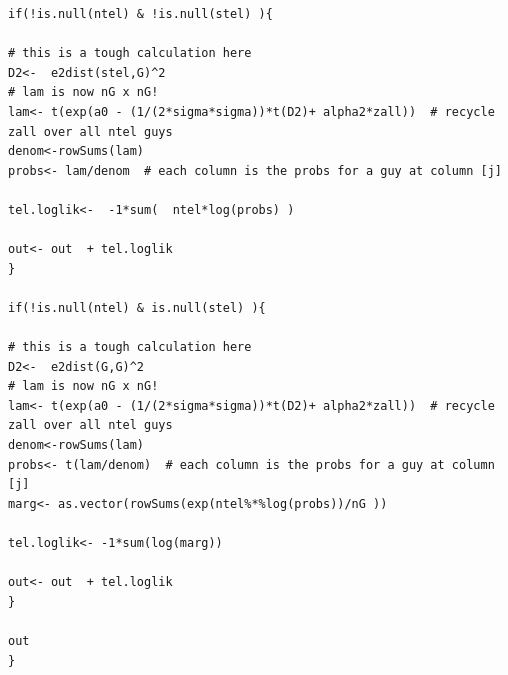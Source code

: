 \documentclass[12pt]{article}
\begin{document}
{\begin{verbatim}
if(!is.null(ntel) & !is.null(stel) ){

# this is a tough calculation here
D2<-  e2dist(stel,G)^2
# lam is now nG x nG!
lam<- t(exp(a0 - (1/(2*sigma*sigma))*t(D2)+ alpha2*zall))  # recycle zall over all ntel guys
denom<-rowSums(lam)
probs<- lam/denom  # each column is the probs for a guy at column [j]

tel.loglik<-  -1*sum(  ntel*log(probs) )

out<- out  + tel.loglik
}

if(!is.null(ntel) & is.null(stel) ){

# this is a tough calculation here
D2<-  e2dist(G,G)^2
# lam is now nG x nG!
lam<- t(exp(a0 - (1/(2*sigma*sigma))*t(D2)+ alpha2*zall))  # recycle zall over all ntel guys
denom<-rowSums(lam)
probs<- t(lam/denom)  # each column is the probs for a guy at column [j]
marg<- as.vector(rowSums(exp(ntel%*%log(probs))/nG ))

tel.loglik<- -1*sum(log(marg))

out<- out  + tel.loglik
}

out
}

\end{verbatim}
}





\clearpage
\newpage
\end{document}
